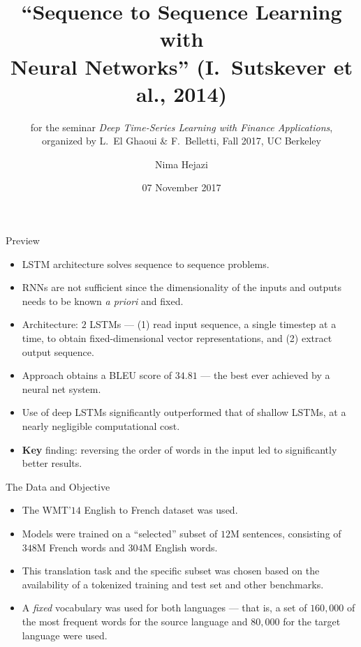 \documentclass{beamer}
\title[lstmseq2seq]{``Sequence to Sequence Learning with \\ Neural Networks''
  \small (I.~Sutskever et al., 2014)}
\subtitle{\vspace*{0.5em} \scriptsize for the seminar \textit{Deep Time-Series
  Learning with Finance Applications},\\ organized by L.~El Ghaoui \&
  F.~Belletti, Fall 2017, UC Berkeley}
\author{Nima Hejazi}
\institute{Division of Biostatistics,\\ University of California, Berkeley}
\date{07 November 2017}
\begin{document}
\begin{frame}
  \titlepage
\end{frame}


\begin{frame}{Preview}

\begin{itemize}
  \itemsep10pt
  \item LSTM architecture solves sequence to sequence problems.
  \item RNNs are not sufficient since the dimensionality of the inputs and
    outputs needs to be known \textit{a priori} and fixed.
  \item Architecture: $2$ LSTMs --- (1) read input sequence, a single timestep
    at a time, to obtain fixed-dimensional vector representations, and (2)
    extract output sequence.
  \item Approach obtains a BLEU score of $34.81$ --- the best ever achieved by a
    neural net system.
  \item Use of deep LSTMs significantly outperformed that of shallow LSTMs, at a
    nearly negligible computational cost.
  \item \textbf{Key} finding: reversing the order of words in the input led to
    significantly better results.
\end{itemize}

\end{frame}


\begin{frame}{The Data and Objective}

\begin{itemize}
  \itemsep10pt
  \item The WMT'$14$ English to French dataset was used.
  \item Models were trained on a ``selected'' subset of $12$M sentences,
    consisting of $348$M French words and $304$M English words.
  \item This translation task and the specific subset was chosen based on the
    availability of a tokenized training and test set and other benchmarks.
  \item A \textit{fixed} vocabulary was used for both languages --- that is, a
    set of $160,000$ of the most frequent words for the source language and
    $80,000$ for the target language were used.
\end{itemize}

\end{frame}
\end{document}
